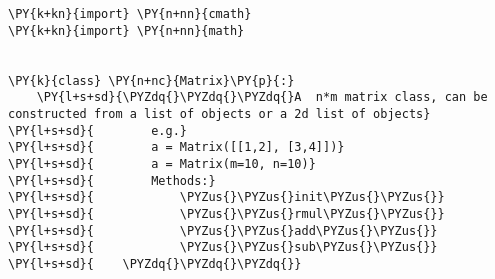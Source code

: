 \begin{Verbatim}[commandchars=\\\{\}]
\PY{k+kn}{import} \PY{n+nn}{cmath}
\PY{k+kn}{import} \PY{n+nn}{math}


\PY{k}{class} \PY{n+nc}{Matrix}\PY{p}{:}
    \PY{l+s+sd}{\PYZdq{}\PYZdq{}\PYZdq{}A  n*m matrix class, can be constructed from a list of objects or a 2d list of objects}
\PY{l+s+sd}{        e.g.}
\PY{l+s+sd}{        a = Matrix([[1,2], [3,4]])}
\PY{l+s+sd}{        a = Matrix(m=10, n=10)}
\PY{l+s+sd}{        Methods:}
\PY{l+s+sd}{            \PYZus{}\PYZus{}init\PYZus{}\PYZus{}}
\PY{l+s+sd}{            \PYZus{}\PYZus{}rmul\PYZus{}\PYZus{}}
\PY{l+s+sd}{            \PYZus{}\PYZus{}add\PYZus{}\PYZus{}}
\PY{l+s+sd}{            \PYZus{}\PYZus{}sub\PYZus{}\PYZus{}}
\PY{l+s+sd}{    \PYZdq{}\PYZdq{}\PYZdq{}}


\end{Verbatim}
